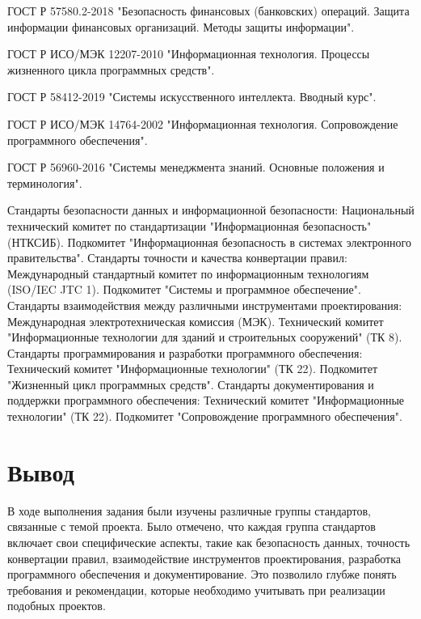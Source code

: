 ГОСТ Р 57580.2-2018 "Безопасность финансовых (банковских) операций. Защита информации финансовых организаций. Методы защиты информации".

ГОСТ Р ИСО/МЭК 12207-2010 "Информационная технология. Процессы жизненного цикла программных средств".

ГОСТ Р 58412-2019 "Системы искусственного интеллекта. Вводный курс".

ГОСТ Р ИСО/МЭК 14764-2002 "Информационная технология. Сопровождение программного обеспечения".

ГОСТ Р 56960-2016 "Системы менеджмента знаний. Основные положения и терминология".


\break


Стандарты безопасности данных и информационной безопасности:
Национальный технический комитет по стандартизации "Информационная безопасность" (НТКСИБ).
Подкомитет "Информационная безопасность в системах электронного правительства".
Стандарты точности и качества конвертации правил:
Международный стандартный комитет по информационным технологиям (ISO/IEC JTC 1).
Подкомитет "Системы и программное обеспечение".
Стандарты взаимодействия между различными инструментами проектирования:
Международная электротехническая комиссия (МЭК).
Технический комитет "Информационные технологии для зданий и строительных сооружений" (ТК 8).
Стандарты программирования и разработки программного обеспечения:
Технический комитет "Информационные технологии" (ТК 22).
Подкомитет "Жизненный цикл программных средств".
Стандарты документирования и поддержки программного обеспечения:
Технический комитет "Информационные технологии" (ТК 22).
Подкомитет "Сопровождение программного обеспечения".


\clearpage

\section*{\LARGE Вывод}

В ходе выполнения задания были изучены различные группы стандартов,
связанные с темой проекта.
Было отмечено, что каждая группа стандартов включает
свои специфические аспекты,
такие как безопасность данных, точность конвертации правил,
взаимодействие инструментов проектирования,
разработка программного обеспечения и документирование.
Это позволило глубже понять требования и рекомендации,
которые необходимо учитывать при реализации подобных проектов.
